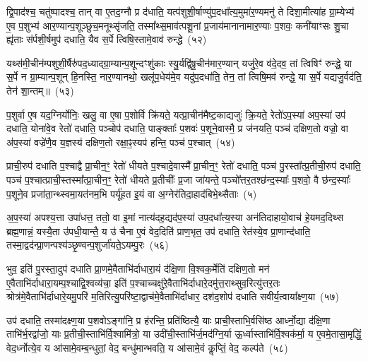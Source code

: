 द्वि॒पाद॑श्च॒ चतु॑ष्पादश्च॒ तान् वा ए॒तद॒ग्नौ प्र द॑धाति॒ यत्प॑शुशी॒र्\mbox{}षाण्यु॑प॒दधा᳚त्य॒मुमा॑र॒ण्यमनु॑ ते दिशा॒मीत्या॑ह ग्रा॒म्येभ्य॑ ए॒व प॒शुभ्य॑ आर॒ण्यान्प॒शूञ्छुच॒मनूथ्सृ॑जति॒ तस्मा᳚थ्स॒माव॑त्पशू॒नां प्र॒जाय॑मानानामार॒ण्याः प॒शवः॒ कनी॑याꣳसः शु॒चा ह्यृ॑ताः स॑र्पशी॒र्\mbox{}षमुप॑ दधाति॒ यैव स॒र्पे त्विषि॒स्तामे॒वाव॑ रुन्द्धे~(५२)

यथ्स॑मी॒चीन॑म्पशुशी॒र्\mbox{}षैरु॑पद॒ध्याद्ग्रा॒म्यान्प॒शून्दꣳशु॑काः स्यु॒र्यद्वि॑षू॒चीन॑मार॒ण्यान् यजु॑रे॒व व॑दे॒दव॒ तां त्विषिꣳ॑ रुन्द्धे॒ या स॒र्पे न ग्रा॒म्यान्प॒शून् हि॒नस्ति॒ नार॒ण्यानथो॒ खलू॑प॒धेय॑मे॒व यदु॑प॒दधा॑ति॒ तेन॒ तां त्विषि॒मव॑ रुन्द्धे॒ या स॒र्पे यद्यजु॒र्वद॑ति॒ तेन॑ शा॒न्तम्॥~(५३)

{\anuvakamend[{ऊ॒नान्तस्योप॑ प्रा॒णाः स्या॒दिति॒ वै प॒शवो॑ रुन्धे॒ चतु॑श्चत्वारिꣳशच्च}]}%

प॒शुर्वा ए॒ष यद॒ग्निर्योनिः॒ खलु॒ वा ए॒षा प॒शोर्वि क्रि॑यते॒ यत्प्रा॒चीन॑मैष्ट॒काद्यजुः॑ क्रि॒यते॒ रेतो॑\-ऽप॒स्या॑ अप॒स्या॑ उप॑ दधाति॒ योना॑वे॒व रेतो॑ दधाति॒ पञ्चोप॑ दधाति॒ पाङ्क्ताः᳚ प॒शवः॑ प॒शूने॒वास्मै॒ प्र ज॑नयति॒ पञ्च॑ दक्षिण॒तो वज्रो॒ वा अ॑प॒स्या॑ वज्रे॑णै॒व य॒ज्ञस्य॑ दक्षिण॒तो रक्षा॒ꣴ॒स्यप॑ हन्ति॒ पञ्च॑ प॒श्चात्~(५४)

प्राची॒रुप॑ दधाति प॒श्चाद्वै प्रा॒चीन॒ꣳ॒ रेतो॑ धीयते प॒श्चादे॒वास्मै᳚ प्रा॒चीन॒ꣳ॒ रेतो॑ दधाति॒ पञ्च॑ पु॒रस्ता᳚त्प्र॒तीची॒रुप॑ दधाति॒ पञ्च॑ प॒श्चात्प्राची॒स्तस्मा᳚त्प्रा॒चीन॒ꣳ॒ रेतो॑ धीयते प्र॒तीचीः᳚ प्र॒जा जा॑यन्ते॒ पञ्चो᳚त्तर॒तश्छ॑न्द॒स्याः᳚ प॒शवो॒ वै छ॑न्द॒स्याः᳚ प॒शूने॒व प्रजा॑ता॒न्थ्स्वमा॒यत॑नम॒भि पर्यू॑हत इ॒यं वा अ॒ग्नेर॑तिदा॒हाद॑बिभे॒थ्सैताः~(५)

अ॒प॒स्या॑ अपश्य॒त्ता उपा॑धत्त॒ ततो॒ वा इ॒मां नात्य॑दह॒द्यद॑प॒स्या॑ उप॒दधा᳚त्य॒स्या अन॑तिदाहायो॒वाच॑ हे॒यमद॒दिथ्स ब्रह्म॒णान्नं॒ यस्यै॒ता उ॑पधी॒यान्तै॒ य उ॑ चैना ए॒वं वेद॒दिति॑ प्राण॒भृत॒ उप॑ दधाति॒ रेत॑स्ये॒व प्रा॒णान्द॑धाति॒ तस्मा॒द्वद॑न्प्रा॒णन्पश्य॑ञ्छृ॒ण्वन्प॒शुर्जा॑यते॒\-ऽयम्पु॒रः~(५६)

भुव॒ इति॑ पु॒रस्ता॒दुप॑ दधाति प्रा॒णमे॒वैताभि॑र्दाधारा॒यं द॑क्षि॒णा वि॒श्वक॒र्मेति॑ दक्षिण॒तो मन॑ ए॒वैताभि॑र्दाधारा॒यम्प॒श्चाद्वि॒श्वव्य॑चा॒ इति॑ प॒श्चाच्चक्षु॑रे॒वैताभि॑र्दाधारे॒दमु॑त्त॒राथ्सुव॒रित्यु॑त्तर॒तः श्रोत्र॑मे॒वैताभि॑र्दाधारे॒यमु॒परि॑ म॒तिरित्यु॒परि॑ष्टा॒द्वाच॑मे॒वैताभि॑र्दाधार॒ दश॑द॒शोप॑ दधाति सवीर्य॒त्वाया᳚क्ष्ण॒या~(५७)

उप॑ दधाति॒ तस्मा॑दक्ष्ण॒या प॒शवो\-ऽङ्गा॑नि॒ प्र ह॑रन्ति॒ प्रति॑ष्ठित्यै॒ याः प्राची॒स्ताभि॒र्वसि॑ष्ठ आर्ध्नो॒द्या द॑क्षि॒णा ताभि॑र्भ॒रद्वा॑जो॒ याः प्र॒तीची॒स्ताभि॑र्वि॒श्वामि॑त्रो॒ या उदी॑ची॒स्ताभि॑र्ज॒मद॑ग्नि॒र्या ऊ॒र्ध्वास्ताभि॑र्वि॒श्वक॑र्मा॒ य ए॒वमे॒तासा॒मृद्धिं॒ वेद॒र्ध्नोत्ये॒व य आ॑सामे॒वम्ब॒न्धुतां॒ वेद॒ बन्धु॑मान्भवति॒ य आ॑सामे॒वं कॢप्तिं॒ वेद॒ कल्प॑ते~(५८)

